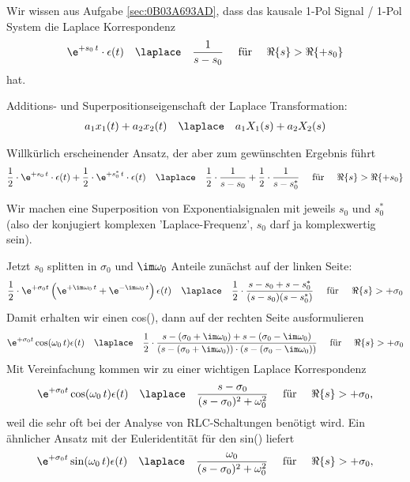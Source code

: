 \begin{Werkzeug}
Wir wissen aus Aufgabe \ref{sec:0B03A693AD}, dass das kausale 1-Pol Signal / 1-Pol System
die Laplace Korrespondenz
\begin{align}
\e^{+s_0 \, t} \cdot \epsilon(t) \quad \laplace \quad \frac{1}{s-s_0} \quad\text{ für } \quad\Re\{s\} > \Re\{+s_0\}\\
\end{align}
hat.

Additions- und Superpositionseigenschaft der Laplace Transformation:
\begin{align}
a_1 x_1(t) + a_2 x_2(t) \quad\laplace\quad  a_1 X_1(s) + a_2 X_2(s)
\end{align}
\end{Werkzeug}
\begin{Ansatz}
Willkürlich erscheinender Ansatz, der aber zum gewünschten Ergebnis führt
\begin{align}
\frac{1}{2}\cdot\e^{+s_0 \, t}\cdot \epsilon(t)+
\frac{1}{2}\cdot\e^{+s_0^* \, t}\cdot \epsilon(t)
\quad \laplace \quad
\frac{1}{2}\cdot\frac{1}{s-s_0} + \frac{1}{2}\cdot\frac{1}{s-s_0^*}
\quad\text{ für } \quad\Re\{s\} > \Re\{+s_0\}
\end{align}
\end{Ansatz}
\begin{ExCalc}
Wir machen eine Superposition von Exponentialsignalen mit jeweils $s_0$ und
$s_0^*$ (also der konjugiert komplexen 'Laplace-Frequenz',
$s_0$ darf ja komplexwertig sein).

Jetzt $s_0$ splitten in $\sigma_0$ und $\im\omega_0$ Anteile zunächst auf der linken
Seite:
\begin{align}
\frac{1}{2}\cdot\e^{+\sigma_0 t}
\left(
\e^{+\im\omega_0 \, t}+
\e^{-\im\omega_0 \, t}
\right) \epsilon(t)
\quad \laplace \quad
\frac{1}{2}\cdot\frac{s-s_0 + s-s_0^*}{(s-s_0)(s-s_0^*)}
\quad\text{ für } \quad\Re\{s\} > +\sigma_0
\end{align}
Damit erhalten wir einen cos(), dann auf der rechten Seite ausformulieren
\begin{align}
\e^{+\sigma_0 t} \cos(\omega_0 \, t) \epsilon(t)
\quad \laplace \quad
\frac{1}{2}\cdot\frac{s-(\sigma_0+\im\omega_0) + s-(\sigma_0-\im\omega_0)}
{(s-(\sigma_0+\im\omega_0)) \cdot (s-(\sigma_0-\im\omega_0))}
\quad\text{ für } \quad\Re\{s\} > +\sigma_0
\end{align}
Mit Vereinfachung kommen wir zu einer wichtigen Laplace Korrespondenz
\begin{align}
\e^{+\sigma_0 t} \cos(\omega_0 \, t) \epsilon(t)
\quad \laplace \quad
\frac{s-\sigma_0}{(s-\sigma_0)^2+\omega_0^2}
\quad\text{ für } \quad\Re\{s\} >  +\sigma_0,
\end{align}
weil die sehr oft bei der Analyse von RLC-Schaltungen benötigt wird.
%
Ein ähnlicher Ansatz mit der Euleridentität für den sin() liefert
\begin{align}
\e^{+\sigma_0 t} \sin(\omega_0 \, t) \epsilon(t)
\quad \laplace \quad
\frac{\omega_0}{(s-\sigma_0)^2+\omega_0^2}
\quad\text{ für } \quad\Re\{s\} >  +\sigma_0,
\end{align}

\end{ExCalc}
